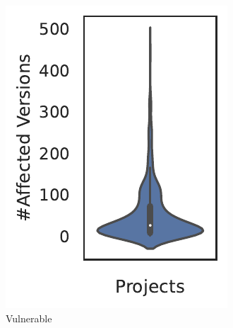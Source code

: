 \begin{figure}
\begin{subfigure}{0.31\columnwidth}
	\includegraphics[width=\textwidth]{chapters/ch3/figs/no_affected_vers.pdf}
    \caption{Vulnerable}
    \label{ch3:fig:dist_no_affected_vers}
\end{subfigure}
\hfill
\begin{subfigure}{0.31\columnwidth}

\end{subfigure}
\end{figure}
